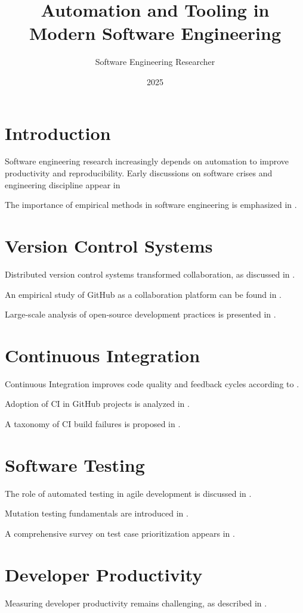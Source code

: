 \documentclass[12pt]{article}
\title{Automation and Tooling in Modern Software Engineering}
\author{Software Engineering Researcher}
\date{2025}
\begin{document}
\maketitle
\onehalfspacing
\cite{Parnas1972onthecrite} 
\section{Introduction}
Software engineering research increasingly depends on automation to improve productivity and reproducibility. Early discussions on software crises and engineering discipline appear in 

\cite{Kervinen2006modelbased}
The importance of empirical methods in software engineering is emphasized in \cite{Vandewoude2007tranquilit}.

\section{Version Control Systems}
Distributed version control systems transformed collaboration, as discussed in \cite{Demuth2012enablingdy}.

An empirical study of GitHub as a collaboration platform can be found in .

Large-scale analysis of open-source development practices is presented in \cite{Majumder2014anelementa}.

\section{Continuous Integration}
Continuous Integration improves code quality and feedback cycles according to .

Adoption of CI in GitHub projects is analyzed in \cite{Davies2017atargeteds}.

A taxonomy of CI build failures is proposed in \cite{Gonzalez2017alargescal}.

\section{Software Testing}
The role of automated testing in agile development is discussed in .

Mutation testing fundamentals are introduced in .

A comprehensive survey on test case prioritization appears in \cite{Cataldo2009softwarede}.

\section{Developer Productivity}
Measuring developer productivity remains challenging, as described in \cite{Baldwin2015canweflipn}.
\end{document}
